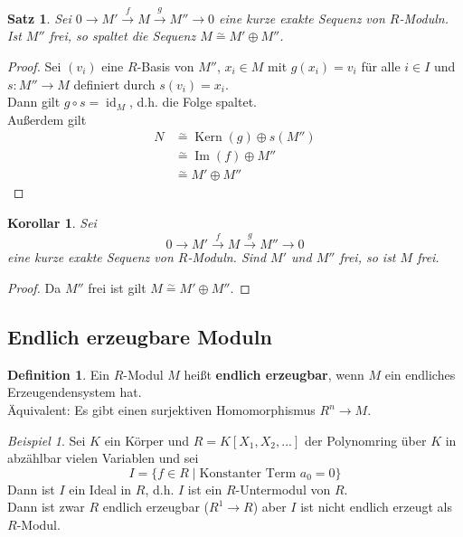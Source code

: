 \documentclass[10pt,a4paper]{article}
\newcommand{\id}{\operatorname{id}}
\newcommand{\isom}{\overset{\sim}{=}}
\newcommand{\Kern}{\operatorname{Kern}}
\newcommand{\Img}{\operatorname{Im}}
\theoremstyle{plain}
\newtheorem{kor}[theorem]{Korollar}
\newtheorem{satz}[theorem]{Satz}
\theoremstyle{definition}
\newtheorem{definition}[theorem]{Definition}
\theoremstyle{remark}
\newtheorem{exm}[theorem]{Beispiel}
\begin{document}
	\begin{satz}
		Sei $0\to M'\xrightarrow{f}M\xrightarrow{g}M''\to 0$ eine kurze exakte Sequenz von $R$-Moduln.\\
		Ist $M''$ frei, so spaltet die Sequenz $M\isom M'\oplus M''$.
	\end{satz}
	\begin{proof}
		Sei $(v_i)$ eine $R$-Basis von $M''$, $x_i\in M$ mit $g(x_i)=v_i$ für alle $i\in I$ und $s:M''\to M$ definiert durch $s(v_i)=x_i$.\\
		Dann gilt $g\circ s=\id_M$, d.h. die Folge spaltet.\\
		Außerdem gilt
		\begin{align*}
		N&\isom\Kern(g)\oplus s(M'')\\
		&\isom\Img(f)\oplus M''\\
		&\isom M'\oplus M''
		\end{align*}
	\end{proof}
	
	\begin{kor}
		Sei
		\[0\to M'\xrightarrow{f}M\xrightarrow{g}M''\to 0\]
		eine kurze exakte Sequenz von $R$-Moduln. Sind $M'$ und $M''$  frei, so ist $M$ frei.
	\end{kor}
	\begin{proof}
		Da $M''$ frei ist gilt $M\isom M'\oplus M''$.
	\end{proof}

	\subsection{Endlich erzeugbare Moduln}
	\begin{definition}
		Ein $R$-Modul $M$ heißt \textbf{endlich erzeugbar}, wenn $M$ ein endliches Erzeugendensystem hat.\\
		Äquivalent: Es gibt einen surjektiven Homomorphismus $R^n\to M$.
	\end{definition}

	\begin{exm}
		Sei $K$ ein Körper und $R=K[X_1,X_2,...]$ der Polynomring über $K$ in abzählbar vielen Variablen und sei
		\[I=\{f\in R\mid \text{Konstanter Term }a_0=0\}\]
		Dann ist $I$ ein Ideal in $R$, d.h. $I$ ist ein $R$-Untermodul von $R$.\\
		Dann ist zwar $R$ endlich erzeugbar ($R^1\to R$) aber $I$ ist nicht endlich erzeugt als $R$-Modul.
	\end{exm}
\end{document}
